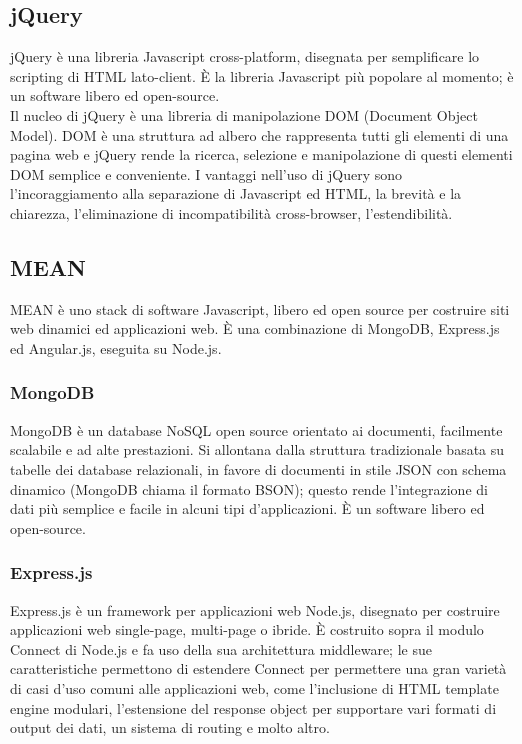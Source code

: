 	\subsection{jQuery}{
		jQuery è una libreria Javascript cross-platform, disegnata per semplificare lo scripting di HTML lato-client. È la libreria Javascript più popolare al momento; è un software libero ed open-source. \\
		Il nucleo di jQuery è una libreria di manipolazione DOM (Document Object Model). DOM è una struttura ad albero che rappresenta tutti gli elementi di una pagina web e jQuery rende la ricerca, selezione e manipolazione di questi elementi DOM semplice e conveniente.
		I vantaggi nell'uso di jQuery sono l'incoraggiamento alla separazione di Javascript ed HTML, la brevità e la chiarezza, l'eliminazione di incompatibilità cross-browser, l'estendibilità.
	}
	\subsection{MEAN}{
		MEAN è uno stack di software Javascript, libero ed open source per costruire siti web dinamici ed applicazioni web. È una combinazione di MongoDB, Express.js ed Angular.js, eseguita su Node.js.
	}
	\subsubsection{MongoDB}{
		MongoDB è un database NoSQL open source orientato ai documenti, facilmente scalabile e ad alte prestazioni. Si allontana dalla struttura tradizionale basata su tabelle dei database relazionali, in favore di documenti in stile JSON con schema dinamico (MongoDB chiama il formato BSON); questo rende l'integrazione di dati più semplice e facile in alcuni tipi d'applicazioni. È un software libero ed open-source.
	}
	\subsubsection{Express.js}{
		Express.js è un framework per applicazioni web Node.js, disegnato per costruire applicazioni web single-page, multi-page o ibride.
		È costruito sopra il modulo Connect di Node.js e fa uso della sua architettura middleware; le sue caratteristiche permettono di estendere Connect per permettere una gran varietà di casi d'uso comuni alle applicazioni web, come l'inclusione di HTML template engine modulari, l'estensione del response object per supportare vari formati di output dei dati, un sistema di routing e molto altro.
	}
